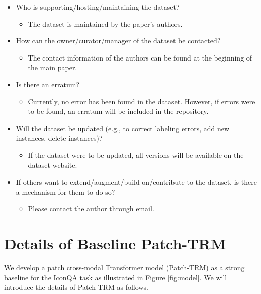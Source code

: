 \documentclass{article}
\begin{document}
\begin{itemize}
    \item Who is supporting/hosting/maintaining the dataset?
    \begin{itemize}
        \item The dataset is maintained by the paper's authors.
    \end{itemize}
    \item How can the owner/curator/manager of the dataset be contacted?
    \begin{itemize}
        \item The contact information of the authors can be found at the beginning of the main paper.
    \end{itemize}
    \item Is there an erratum?
    \begin{itemize}
        \item Currently, no error has been found in the dataset. However, if errors were to be found, an erratum will be included in the repository.
    \end{itemize}
    \item Will the dataset be updated (e.g., to correct labeling errors, add new instances, delete instances)?
    \begin{itemize}
        \item If the dataset were to be updated, all versions will be available on the dataset website.
    \end{itemize}
    \item If others want to extend/augment/build on/contribute to the dataset, is there a mechanism for them to do so?
    \begin{itemize}
        \item Please contact the author through email.
    \end{itemize}

\end{itemize}




\section{Details of Baseline Patch-TRM}
\label{app_patchtrm}
We develop a patch cross-modal Transformer model (Patch-TRM) as a strong baseline for the IconQA task as illustrated in Figure \ref{fig:model}. We will introduce the details of Patch-TRM as follows.
\end{document}

